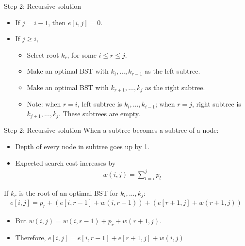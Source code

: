\documentclass[aspectratio=169]{beamer}
\begin{document}
\begin{frame}{Step 2: Recursive solution}
    \begin{itemize}
        \item If $j = i - 1$, then $e[i, j] = 0$.
        \item If $j \geq i$,
            \begin{itemize}
                \item Select root $k_r$, for some $i \leq r \leq j$.
                \item Make an optimal BST with $k_i, \ldots, k_{r-1}$ as the left subtree.
                \item Make an optimal BST with $k_{r+1}, \ldots, k_j$ as the right subtree.
                \item Note: when $r = i$, left subtree is $k_i, \dots, k_{i-1}$; when $r = j$, right subtree is $k_{j+1}, \ldots, k_j$.  These subtrees are empty.
            \end{itemize}
    \end{itemize}
\end{frame}

\begin{frame}{Step 2: Recursive solution}
    When a subtree becomes a subtree of a node:
    \begin{itemize}
        \item Depth of every node in subtree goes up by 1.
        \item Expected search cost increases by
            \begin{equation*}
                \begin{align*}
                    w(i, j) = \sum_{l = i}^{j} p_l
                \end{align*}
            \end{equation*}
    \end{itemize}
    If $k_r$ is the root of an optimal BST for $k_i, \ldots, k_j$:
        \begin{equation*}
            \begin{align*}
                e[i, j] = p_r + (e[i, r-1] + w(i, r-1)) + (e[r+1, j] + w(r+1, j))
            \end{align*}
        \end{equation*}
    \begin{itemize}
        \item But $w(i, j) = w(i, r-1) + p_r + w(r+1, j)$.
        \item Therefore, $e[i, j] = e[i,r-1] + e[r+1, j] + w(i, j)$
    \end{itemize}
\end{frame}
\end{document}
